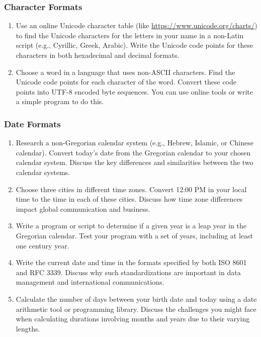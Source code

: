 \begin{exerciseboxcomputer}
\subsubsection*{Character Formats}
\begin{enumerate}
	\item Use an online Unicode character table (like \url{https://www.unicode.org/charts/}) to find the Unicode characters for the letters in your name in a non-Latin script (e.g., Cyrillic, Greek, Arabic). Write the Unicode code points for these characters in both hexadecimal and decimal formats.
	\item Choose a word in a language that uses non-ASCII characters. Find the Unicode code points for each character of the word. Convert these code points into UTF-8 encoded byte sequences. You can use online tools or write a simple program to do this.
\end{enumerate}
\end{exerciseboxcomputer}

\begin{exerciseboxcomputer}
\subsubsection*{Date Formats}
\begin{enumerate}
    \item Research a non-Gregorian calendar system (e.g., Hebrew, Islamic, or Chinese calendar). Convert today's date from the Gregorian calendar to your chosen calendar system. Discuss the key differences and similarities between the two calendar systems.
    \item Choose three cities in different time zones. Convert 12:00 PM in your local time to the time in each of these cities. Discuss how time zone differences impact global communication and business.
    \item Write a program or script to determine if a given year is a leap year in the Gregorian calendar. Test your program with a set of years, including at least one century year.
    \item Write the current date and time in the formats specified by both ISO 8601 and RFC 3339. Discuss why such standardizations are important in data management and international communications.
    \item Calculate the number of days between your birth date and today using a date arithmetic tool or programming library. Discuss the challenges you might face when calculating durations involving months and years due to their varying lengths.
\end{enumerate}
\end{exerciseboxcomputer}


